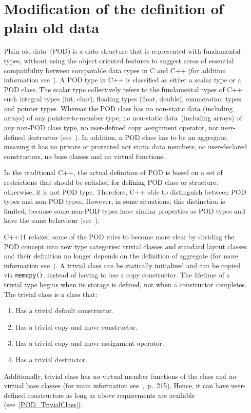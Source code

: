\documentclass[11pt]{report}
\begin{document}
\section{Modification of the definition of plain old data}
\label{section: Modification of the definition of plain old data}
Plain old data~(POD) is a data structure that is represented with fundamental types, without using the object oriented features to suggest areas of essential compatibility between comparable data types in C and C++ (for addition information see~\cite{Stroustrup:2012:Cpp11}). A POD type in C++ is classified as either a scalar type or a POD class. The scalar type collectively refers to the fundamental types of C++ such integral types (int, char), floating types (float, double), enumeration types and pointer types. Whereas the POD class has no non-static data (including arrays) of any pointer-to-member type, no non-static data~(including arrays) of any non-POD class type, no user-defined copy assignment operator, nor user-defined destructor (see~\cite{MSDN:2012:CppModern}). In addition, a POD class has to be an aggregate, meaning it has no private or protected not static data members, no user-declared constructors, no base classes and no virtual functions.

In the traditional C++, the actual definition of POD is based on a set of restrictions that should be satisfied for defining POD class or structure; otherwise, it is not POD type. Therefore, C++ able to distinguish between POD types and non-POD types. However, in some situations, this distinction is limited, because some non-POD types have similar properties as POD types and have the same behaviour (see~\cite{Stroustrup:2012:Cpp11}).

C++11 relaxed some of the POD rules to become more clear by dividing the POD concept into new type categories: trivial classes and standard layout classes and their definition no longer depends on the definition of aggregate (for more information see~\cite{MSDN:2012:CppModern}). A trivial class can be statically initialized and can be copied via \texttt{memcpy()}, instead of having to use a copy constructor. The lifetime of a trivial type begins when its storage is defined, not when a constructor completes. The trivial class is a class that:
\begin{enumerate}
\item	Has a trivial default constructor. 
\item	Has a trivial copy and move constructor.
\item	Has a trivial copy and move assignment operator.
\item	Has a trivial destructor.
\end{enumerate}
Additionally, trivial class has no virtual member functions of the class and no virtual base classes (for main information see~\cite{ISO:2011:Cpplanguage},~p.~215). Hence, it can have user-defined constructors as long as above requirements are available (see~\ref{POD_TrivialClass}).
\end{document}
